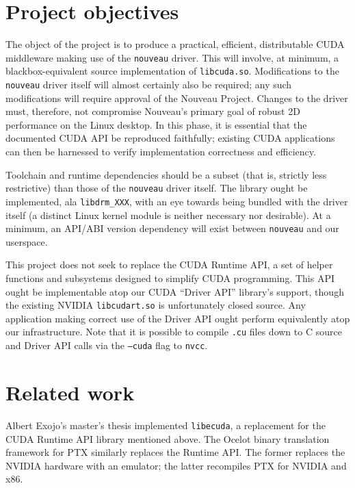\documentclass[letterpaper,10pt]{article}
\begin{document}
\begin{multicols}{2}
\section{Project objectives}
The object of the project is to produce a practical, efficient, distributable
CUDA middleware making use of the \texttt{nouveau} driver. This will involve,
at minimum, a blackbox-equivalent source implementation of \texttt{libcuda.so}.
Modifications to the \texttt{nouveau} driver itself will almost certainly also
be required; any such modifications will require approval of the Nouveau Project.
Changes to the driver must, therefore, not compromise Nouveau's primary goal of
robust 2D performance on the Linux desktop. In this phase, it is essential that
the documented CUDA API be reproduced faithfully; existing CUDA applications can
then be harnessed to verify implementation correctness and efficiency.

Toolchain and runtime dependencies should be a subset (that is, strictly less
restrictive) than those of the \texttt{nouveau} driver itself. The library
ought be implemented, ala \texttt{libdrm\_XXX}, with an eye towards being bundled
with the driver itself (a distinct Linux kernel module is neither necessary nor
desirable). At a minimum, an API/ABI version dependency will exist between
\texttt{nouveau} and our userspace.

This project does not seek to replace the CUDA Runtime API, a set of helper
functions and subsystems designed to simplify CUDA programming. This API ought
be implementable atop our CUDA ``Driver API'' library's support, though the
existing NVIDIA \texttt{libcudart.so} is unfortunately closed source. Any
application making correct use of the Driver API ought perform equivalently atop
our infrastructure. Note that it is possible to compile \texttt{.cu} files down
to C source and Driver API calls via the \texttt{--cuda} flag to \texttt{nvcc}\cite{nvcc}.
\section{Related work}
Albert Exojo's master's thesis implemented \texttt{libecuda}\cite{exojo}, a replacement for
the CUDA Runtime API library mentioned above. The Ocelot\cite{ocelot} binary translation
framework for PTX similarly replaces the Runtime API. The former replaces the NVIDIA
hardware with an emulator; the latter recompiles PTX for NVIDIA and x86.


\end{multicols}
\end{document}

